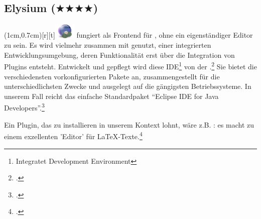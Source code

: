 %
%
%



\subsection{Elysium ($\bigstar\bigstar\bigstar\bigstar$)}

\parpic(1cm,0.7cm)[r][t]{\includegraphics[width=1cm]{logos/elysium-300dpi.png}}
\label{Elysium} fungiert als Frontend für , ohne ein
eigenständiger Editor zu sein. Es wird vielmehr zusammen mit 
genutzt, einer integrierten Entwicklungsumgebung, deren Funktionalität erst über
die Integration von Plugins entsteht. Entwickelt und gepflegt wird diese
IDE\footnote{Integratet Development Environment} von der .\footcite[vgl.][\nopage wp.]{Eclipse2018a} Sie bietet die
verschiedensten vorkonfigurierten Pakete an, zusammengestellt für die
unterschiedlichsten Zwecke und ausgelegt auf die gängigsten Betriebssysteme. In
unserem Fall reicht das einfache Standardpaket \enquote{Eclipse IDE for Java
Developers}.\footcite[vgl.][\nopage wp.]{Eclipse2018b}

Ein Plugin, das zu installieren in unserem Kontext lohnt, wäre z.B.
: es macht  zu einem exzellenten 'Editor' für
\LaTeX-Texte.\footcite[vgl.][\nopage wp.]{TeXlipse2019a}

